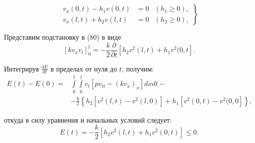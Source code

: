 \documentclass{article}
\begin{document}
\begin{equation}
\left.
\begin{aligned}
v_x(0,t) - h_1v(0,t) &= 0 &(h_1 \ge 0), \\
v_x(l,t) + h_2v(l,t) &= 0 &(h_2 \ge 0),
\end{aligned}
\right\}
\tag{85}
\end{equation}

Представим подстановку в (80) в виде 
\[ [kv_x v_t]^l_0 = - \frac{k}{2} \frac{\partial}{\partial t}[h_2 v^2(l,t) + h_1 v^2(0,t]. \]

Интегрируя $\frac{dE}{dt}$ в пределах от нуля до $t$, получим:
\begin{equation}
\begin{aligned}
E(t) - E(0) = &\int\limits_0^t \int\limits_0^l v_t[pv_{tt} - (kv_x)_x] dx dt - \\
&- \frac{k}{2}\left\{ h_2[v^2(l,t) - v^2(l,0)] + h_1[v^2(0,t) - v^2(0,0] \right\},
\end{aligned}
\tag*{}
\end{equation}

откуда в силу уравнения и начальных условий следует:
\begin{equation}
E(t) = - \frac{k}{2}[h_2v^2(l,t) + h_1v^2(0,t)] \le 0.
\tag{86}
\end{equation}
\end{document}
